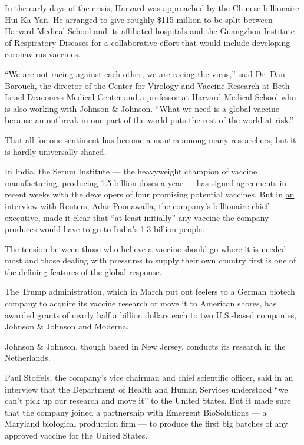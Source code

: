 In the early days of the crisis, Harvard was approached by the Chinese
billionaire Hui Ka Yan. He arranged to give roughly \$115 million to be
split between Harvard Medical School and its affiliated hospitals and
the Guangzhou Institute of Respiratory Diseases for a collaborative
effort that would include developing coronavirus vaccines.

``We are not racing against each other, we are racing the virus,'' said
Dr. Dan Barouch, the director of the Center for Virology and Vaccine
Research at Beth Israel Deaconess Medical Center and a professor at
Harvard Medical School who is also working with Johnson \& Johnson.
``What we need is a global vaccine --- because an outbreak in one part
of the world puts the rest of the world at risk.''

That all-for-one sentiment has become a mantra among many researchers,
but it is hardly universally shared.

In India, the Serum Institute --- the heavyweight champion of vaccine
manufacturing, producing 1.5 billion doses a year --- has signed
agreements in recent weeks with the developers of four promising
potential vaccines. But in
\href{https://www.nytimes3xbfgragh.onion/reuters/2020/04/28/world/europe/28reuters-health-coronavirus-india-vaccine.html}{an
interview with Reuters}, Adar Poonawalla, the company's billionaire
chief executive, made it clear that ``at least initially'' any vaccine
the company produces would have to go to India's 1.3 billion people.

The tension between those who believe a vaccine should go where it is
needed most and those dealing with pressures to supply their own country
first is one of the defining features of the global response.

The Trump administration, which in March put out feelers to a German
biotech company to acquire its vaccine research or move it to American
shores, has awarded grants of nearly half a billion dollars each to two
U.S.-based companies, Johnson \& Johnson and Moderna.

Johnson \& Johnson, though based in New Jersey, conducts its research in
the Netherlands.

Paul Stoffels, the company's vice chairman and chief scientific officer,
said in an interview that the Department of Health and Human Services
understood ``we can't pick up our research and move it'' to the United
States. But it made sure that the company joined a partnership with
Emergent BioSolutions --- a Maryland biological production firm --- to
produce the first big batches of any approved vaccine for the United
States.

